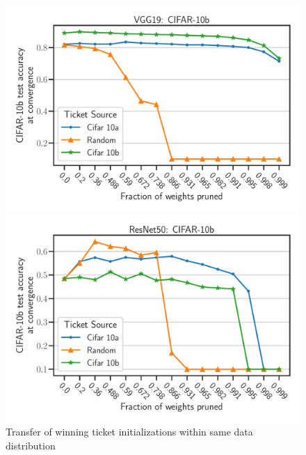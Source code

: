       
    \begin{figure}[h]
        \centering
        \begin{minipage}{.497\textwidth}
        \centering
        \includegraphics[width=\textwidth]{../openreview/plots/Exp1_VGG_N.pdf}
        \end{minipage}
        \begin{minipage}{.497\textwidth}
        \centering
        \includegraphics[width=\textwidth]{../openreview/plots/Exp1_ResNet_N.pdf}
        \end{minipage}
        \caption{Transfer of winning ticket initializations within same data distribution}
        \label{fig:exp1}
    \end{figure}
    
